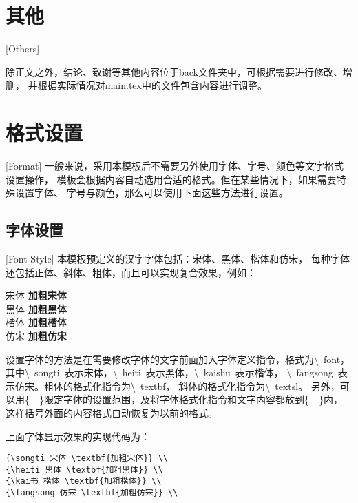 \section{其他}[Others]

除正文之外，结论、致谢等其他内容位于back文件夹中，可根据需要进行修改、增删，
并根据实际情况对main.tex中的文件包含内容进行调整。

\section{格式设置}[Format]
一般来说，采用本模板后不需要另外使用字体、字号、颜色等文字格式设置操作，
模板会根据内容自动选用合适的格式。但在某些情况下，如果需要特殊设置字体、
字号与颜色，那么可以使用下面这些方法进行设置。

\subsection{字体设置}[Font Style]
本模板预定义的汉字字体包括：{\songti 宋体}、{\heiti 黑体}、{\kaishu 楷体}和{\fangsong 仿宋}，
每种字体还包括正体、斜体、粗体，而且可以实现复合效果，例如：

\begin{flushleft}
  {
  {\songti 宋体 \textbf{加粗宋体}} \\
  {\heiti 黑体 \textbf{加粗黑体}} \\
  {\kaishu 楷体 \textbf{加粗楷体}} \\
  {\fangsong 仿宋 \textbf{加粗仿宋}} \\
  }
\end{flushleft}

设置字体的方法是在需要修改字体的文字前面加入字体定义指令，格式为\textbackslash~font，
其中\textbackslash~songti~表示宋体，\textbackslash~heiti~表示黑体，\textbackslash~kaishu~表示楷体，
\textbackslash~fangsong~表示仿宋。粗体的格式化指令为\textbackslash~textbf，
斜体的格式化指令为\textbackslash~textsl。
另外，可以用\{~~\}限定字体的设置范围，及将字体格式化指令和文字内容都放到\{~~\}内，
这样括号外面的内容格式自动恢复为以前的格式。

上面字体显示效果的实现代码为：

\begin{lstlisting}
{\songti 宋体 \textbf{加粗宋体}} \\
{\heiti 黑体 \textbf{加粗黑体}} \\
{\kai书 楷体 \textbf{加粗楷体}} \\
{\fangsong 仿宋 \textbf{加粗仿宋}} \\
\end{lstlisting}

